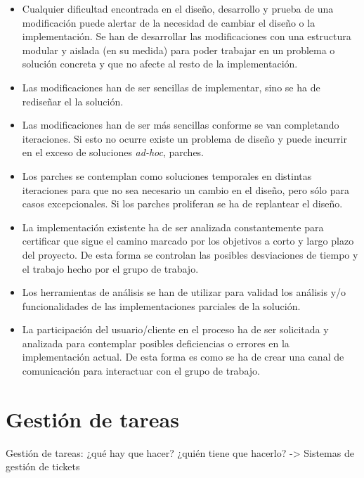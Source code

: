 \begin{itemize}
	\item Cualquier dificultad encontrada en el diseño, desarrollo y prueba de una modificación puede alertar de la necesidad de cambiar el diseño o la implementación. Se han de desarrollar las modificaciones con una estructura modular y aislada (en su medida) para poder trabajar en un problema o solución concreta y que no afecte al resto de la implementación.
	\item Las modificaciones han de ser sencillas de implementar, sino se ha de rediseñar el la solución.
	\item Las modificaciones han de ser más sencillas conforme se van completando iteraciones. Si esto no ocurre existe un problema de diseño y puede incurrir en el exceso de soluciones \emph{ad-hoc}, parches.
	\item Los parches se contemplan como soluciones temporales en distintas iteraciones para que no sea necesario un cambio en el diseño, pero sólo para casos excepcionales. Si los parches proliferan se ha de replantear el diseño.
	\item La implementación existente ha de ser analizada constantemente para certificar que sigue el camino marcado por los objetivos a corto y largo plazo del proyecto. De esta forma se controlan las posibles desviaciones de tiempo y el trabajo hecho por el grupo de trabajo.
	\item Los herramientas de análisis se han de utilizar para validad los análisis y/o funcionalidades de las implementaciones parciales de la solución.
	\item La participación del usuario/cliente en el proceso ha de ser solicitada y analizada para contemplar posibles deficiencias o errores en la implementación actual. De esta forma es como se ha de crear una canal de comunicación para interactuar con el grupo de trabajo.
\end{itemize}



\section{Gestión de tareas}
\label{sec:gestion-tareas}

\par Gestión de tareas: ¿qué hay que hacer? ¿quién tiene que hacerlo? -> Sistemas de gestión de tickets

